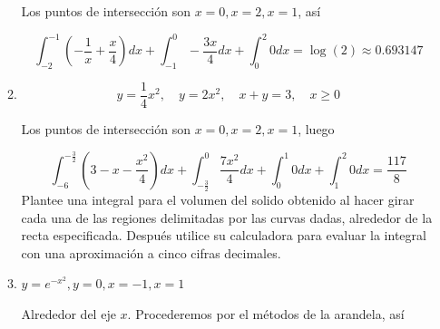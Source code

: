 \documentclass{report}
\begin{document}
\begin{enumerate}[label=\textcolor{Red}{\textbf{\arabic*.}}]
\begin{enumerate}[label=\textcolor{OliveGreen}{\textbf{\arabic*.}}]
                \begin{center}
                \end{center}

                Los puntos de intersección son $x = 0, x=2, x=1$, así

                $$\int_{-2}^{-1}\left(-\frac{1}{x}+\frac{x}{4}\right) d x+\int_{-1}^0-\frac{3 x}{4} d x+\int_0^2 0 d x=\log (2) \approx 0.693147$$

                \item $$
                y=\frac{1}{4} x^{2}, \quad y=2 x^{2}, \quad x+y=3, \quad x \geq 0
                $$

                Los puntos de intersección son $x=0, x=2, x=1$, luego

                $$\int_{-6}^{-\frac{3}{2}}\left(3-x-\frac{x^2}{4}\right) d x+\int_{-\frac{3}{2}}^0 \frac{7 x^2}{4} d x+\int_0^1 0 d x+\int_1^2 0 d x=\frac{117}{8}$$
                Plantee una integral para el volumen del solido obtenido al hacer girar cada una de las regiones delimitadas por las curvas dadas, alrededor de la recta especificada. Después utilice su calculadora para evaluar la integral con una aproximación a cinco cifras decimales.

                \item $y = e^{-x^2}, y=0, x=-1, x=1$

                Alrededor del eje $x$. Procederemos por el métodos de la arandela, así


\end{enumerate}
\end{enumerate}
\end{document}
